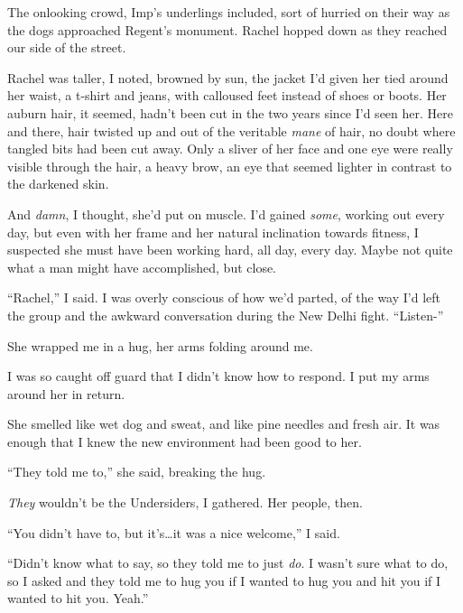 The onlooking crowd, Imp's underlings included, sort of hurried on their way as the dogs approached Regent's monument.  Rachel hopped down as they reached our side of the street.



Rachel was taller, I noted, browned by sun, the jacket I'd given her tied around her waist, a t-shirt and jeans, with calloused feet instead of shoes or boots.  Her auburn hair, it seemed, hadn't been cut in the two years since I'd seen her.  Here and there, hair twisted up and out of the veritable \emph{mane} of hair, no doubt where tangled bits had been cut away.  Only a sliver of her face and one eye were really visible through the hair, a heavy brow, an eye that seemed lighter in contrast to the darkened skin.



And \emph{damn}, I thought, she'd put on muscle.  I'd gained \emph{some}, working out every day, but even with her frame and her natural inclination towards fitness, I suspected she must have been working hard, all day, every day.  Maybe not quite what a man might have accomplished, but close.



``Rachel,'' I said.  I was overly conscious of how we'd parted, of the way I'd left the group and the awkward conversation during the New Delhi fight.  ``Listen-''



She wrapped me in a hug, her arms folding around me.



I was so caught off guard that I didn't know how to respond.  I put my arms around her in return.



She smelled like wet dog and sweat, and like pine needles and fresh air.  It was enough that I knew the new environment had been good to her.



``They told me to,'' she said, breaking the hug.



\emph{They} wouldn't be the Undersiders, I gathered.  Her people, then.



``You didn't have to, but it's\ldots it was a nice welcome,'' I said.



``Didn't know what to say, so they told me to just \emph{do}.  I wasn't sure what to do, so I asked and they told me to hug you if I wanted to hug you and hit you if I wanted to hit you.  Yeah.''



